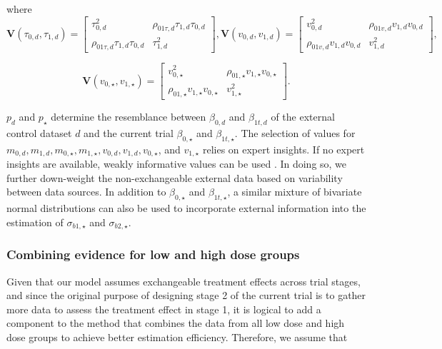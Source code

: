where $$\boldsymbol{V}(\tau_{0,d}, \tau_{1,d}) = \begin{bmatrix} \tau_{0,d}^2 & \rho_{01\tau,d}\tau_{1,d}\tau_{0,d}\\ \rho_{01\tau,d}\tau_{1,d}\tau_{0,d} & \tau_{1,d}^2\end{bmatrix}, \boldsymbol{V}(v_{0,d}, v_{1,d}) = \begin{bmatrix} v_{0,d}^2 & \rho_{01v,d}v_{1,d}v_{0,d}\\ \rho_{01v,d}v_{1,d}v_{0,d} & v_{1,d}^2\end{bmatrix},$$

$$\boldsymbol{V}(v_{0,\star}, v_{1,\star}) = \begin{bmatrix} v_{0,\star}^2 & \rho_{01,\star}v_{1,\star}v_{0,\star}\\ \rho_{01,\star}v_{1,\star}v_{0,\star} & v_{1,\star}^2\end{bmatrix}.$$

$p_d$ and $p_\star$ determine the resemblance between $\beta_{0,d}$ and $\beta_{1t,d}$ of the external control dataset $d$ and the current trial $\beta_{0, \star}$ and $\beta_{1t,\star}$. The selection of values for $m_{0,d}, m_{1,d}, m_{0,\star}, m_{1,\star}, v_{0,d}, v_{1,d}, v_{0,\star}$, and $v_{1,\star}$ relies on expert insights. If no expert insights are available, weakly informative values can be used \citep{kass1995reference}.
In doing so, we further down-weight the non-exchangeable external data based on variability between data sources. In addition to $\beta_{0,\star}$ and $\beta_{1t,\star}$, a similar mixture of bivariate normal distributions can also be used to incorporate external information into the estimation of $\sigma_{b1,\star}$ and $\sigma_{b2,\star}$.

\subsubsection{Combining evidence for low and high dose groups}
Given that our model assumes exchangeable treatment effects across trial stages, and since the original purpose of designing stage 2 of the current trial is to gather more data to assess the treatment effect in stage 1, it is logical to add a component to the method that combines the data from all low dose and high dose groups to achieve better estimation efficiency. Therefore, we assume that 

